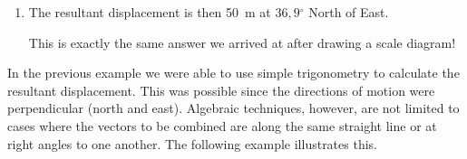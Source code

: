 {\begin{mdframed}[linewidth=4, leftmargin=40, rightmargin=40]
\begin{exercise}
\begin{enumerate}[noitemsep, label=\textbf{Step} \textbf{\arabic*}. ]
{\begin{minipage}{\columnwidth}
    \parbox[t]{\mymathboxwidth}{\large\begin{math}
    tan\alpha =\frac{\mathrm{opposite\; side}}{\mathrm{adjacent\; side}}tan\alpha =\frac{30}{40}\alpha ={tan}^{-1}\left(0,75\right)\alpha =36,{9}^{\circ }\end{math}}\hfill
    \parbox[t]{48pt}{\raggedleft 
    (19.10)}
    \end{minipage}\vspace{12pt}\par
    }%
    
          
          \item  
          \label{m38816*id192009}The resultant displacement is then 50~m at \begin{math}36,9{}^{\circ }\end{math} North of East.\par 
          \label{m38816*id192027}This is exactly the same answer we arrived at after drawing a scale diagram! \par 
          \end{enumerate}
         

    \end{exercise}
    \end{mdframed}
    }
    \noindent
  
          \label{m38816*id192042}In the previous example we were able to use simple trigonometry to
calculate the resultant displacement. This was possible since the
directions of motion were perpendicular (north and east).
Algebraic techniques, however, are not limited to cases where the vectors to be combined are along the same straight line or at right angles to one
another. The following example illustrates this.\par 
\label{m38816*secfhsst!!!underscore!!!id1676}\vspace{.5cm} 
      
